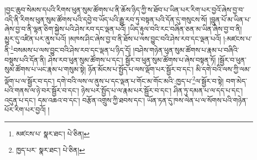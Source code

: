 །བྱང་ཆུབ་སེམས་དཔའི་རིགས་ཕུན་སུམ་ཚོགས་པ་ནི་ཆོས་ཉིད་ཀྱི་ས་ཐོབ་པ་ཡིན་པར་རིག་པར་བྱའོ་ཞེས་བྱ་བ་འདི་ནི་རིགས་ཕུན་སུམ་ཚོགས་པའི་དབྱེ་བ་ཡོད་པའི་རྒྱུ་རབ་ཏུ་བསྟན་པའི་དོན་དུ་གསུངས་སོ། །བླུན་པོ་མ་ཡིན་པ་ཞེས་བྱ་བ་ནི་ལྷན་ཅིག་སྐྱེས་པའི་ཤེས་རབ་དང་ལྡན་པའོ། །ཡིད་རྟུལ་བའི་རང་བཞིན་ཅན་མ་ཡིན་ཞེས་བྱ་བ་ནི། མྱུར་དུ་འཛིན་པར་ནུས་པའོ། །མཁས་ཤིང་ཞེས་བྱ་བ་ནི་ཐོས་པ་ལས་བྱུང་བའི་ཤེས་རབ་དང་ལྡན་པའོ། །:མཛངས་པ་ནི་\footnote{མཛངས་པ་  སྣར་ཐང་།  པེ་ཅིན། }བསམས་པ་ལས་བྱུང་བའི་ཤེས་རབ་དང་ལྡན་པ་ཉིད་དོ། །བཤེས་གཉེན་ཕུན་སུམ་ཚོགས་པ་རྣམ་པ་བཞིའི་བསྡུས་པའི་དོན་ནི། ཤེས་རབ་ཕུན་སུམ་ཚོགས་པ་དང་། སྦྱོར་བ་ཕུན་སུམ་ཚོགས་པ་ཞེས་བསྟན་ཏོ། །སྦྱོར་བ་ཕུན་སུམ་ཚོགས་པ་ཡང་རྣམ་པ་གསུམ་སྟེ། ཉོན་མོངས་པ་སྤྱོད་པ་ལས་ལྡོག་པར་སྦྱོར་བ་དང་། མི་དགེ་བའི་ལས་ཀྱི་ལམ་ལྡོག་པ་ལ་སྦྱོར་བ་དང་། དགེ་བའི་ལས་ལ་ནུས་པ་དང་ལྡན་པ་གོང་མ་གོང་མའི་:ཁྱད་པ་\footnote{ཁྱད་པར་  སྣར་ཐང་།  པེ་ཅིན། }ལ་སྦྱོར་བ་སྟེ། བག་མེད་པའི་གནས་ལ་ཉེ་བར་སྦྱོར་བ་དང་། ཉེས་པར་སྤྱོད་པ་ལ་རྣམ་པར་སྦྱོར་བ་དང་། ཤིན་ཏུ་དམན་པ་ལ་དད་པ་དང་། འདུན་པ་དང་། དམ་འཆའ་བ་དང་། བརྩོན་འགྲུས་ཀྱི་ཐབས་དང་། ཡོན་ཏན་དུ་ཁས་ལེན་པ་ལ་སོགས་པའི་གཉེན་པོར་རིག་པར་བྱའོ། །
